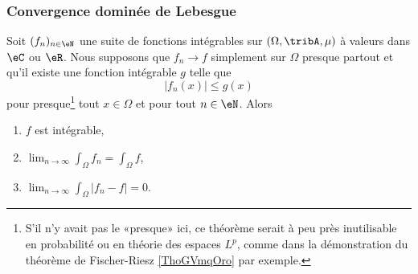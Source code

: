 \subsubsection{Convergence dominée de Lebesgue}

\begin{theorem}        \label{ThoConvDomLebVdhsTf}
    Soit \( (f_n)_{n\in\eN}\) une suite de fonctions intégrables sur \( (\Omega,\tribA,\mu)\) à valeurs dans \( \eC\) ou \( \eR\). Nous supposons que  \( f_n\to f\) simplement sur \( \Omega\) presque partout et qu'il existe une fonction intégrable \( g\) telle que
    \begin{equation}
        | f_n(x) | \leq g(x) 
    \end{equation}
    pour presque\footnote{S'il n'y avait pas le «presque» ici, ce théorème serait à peu près inutilisable en probabilité ou en théorie des espaces \( L^p\), comme dans la démonstration du théorème de Fischer-Riesz \ref{ThoGVmqOro} par exemple.} tout \( x\in\Omega\) et pour tout \( n\in \eN\). Alors
    \begin{enumerate}
        \item
            \( f\) est intégrable,
        \item
           $\lim_{n\to \infty} \int_{\Omega}f_n=\int_\Omega f$,
        \item
            $\lim_{n\to \infty} \int_{\Omega}| f_n-f |=0$.
    \end{enumerate}
\end{theorem}

